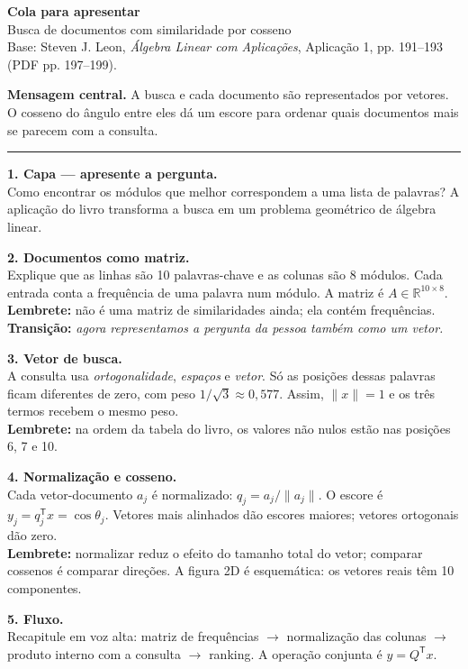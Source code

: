 \documentclass[10pt,a4paper]{article}
\newcommand{\lembrete}[1]{\textcolor{udescgreen}{\textbf{Lembrete:}} #1}
\newcommand{\transicao}[1]{\textcolor{queryorange}{\textbf{Transição:}} \emph{#1}}
\newcommand{\secao}[1]{\vspace{3pt}{\large\color{udescgreen}\textbf{#1}}\par\vspace{1pt}\hrule\vspace{4pt}}
\begin{document}
{\LARGE\color{udescgreen}\textbf{Cola para apresentar}}\\[-1pt]
{\large\color{ink}Busca de documentos com similaridade por cosseno}\\
{\small Base: Steven J. Leon, \textit{Álgebra Linear com Aplicações}, Aplicação 1, pp. 191--193 (PDF pp. 197--199).}

\vspace{5pt}
\colorbox{softgreen}{\parbox{\dimexpr\linewidth-2\fboxsep\relax}{\textbf{Mensagem central.} A busca e cada documento são representados por vetores. O cosseno do ângulo entre eles dá um escore para ordenar quais documentos mais se parecem com a consulta.}}

\secao{Roteiro dos slides}

\textbf{1. Capa — apresente a pergunta.}\\
Como encontrar os módulos que melhor correspondem a uma lista de palavras? A aplicação do livro transforma a busca em um problema geométrico de álgebra linear.

\textbf{2. Documentos como matriz.}\\
Explique que as linhas são 10 palavras-chave e as colunas são 8 módulos. Cada entrada conta a frequência de uma palavra num módulo. A matriz é $A\in\mathbb{R}^{10\times8}$.\\
\lembrete{não é uma matriz de similaridades ainda; ela contém frequências.}\\
\transicao{agora representamos a pergunta da pessoa também como um vetor.}

\textbf{3. Vetor de busca.}\\
A consulta usa \emph{ortogonalidade}, \emph{espaços} e \emph{vetor}. Só as posições dessas palavras ficam diferentes de zero, com peso $1/\sqrt{3}\approx0{,}577$. Assim, $\|x\|=1$ e os três termos recebem o mesmo peso.\\
\lembrete{na ordem da tabela do livro, os valores não nulos estão nas posições 6, 7 e 10.}

\textbf{4. Normalização e cosseno.}\\
Cada vetor-documento $a_j$ é normalizado: $q_j=a_j/\|a_j\|$. O escore é $y_j=q_j^{\mathsf T}x=\cos\theta_j$. Vetores mais alinhados dão escores maiores; vetores ortogonais dão zero.\\
\lembrete{normalizar reduz o efeito do tamanho total do vetor; comparar cossenos é comparar direções. A figura 2D é esquemática: os vetores reais têm 10 componentes.}

\textbf{5. Fluxo.}\\
Recapitule em voz alta: matriz de frequências $\rightarrow$ normalização das colunas $\rightarrow$ produto interno com a consulta $\rightarrow$ ranking. A operação conjunta é $y=Q^{\mathsf T}x$.
\end{document}
